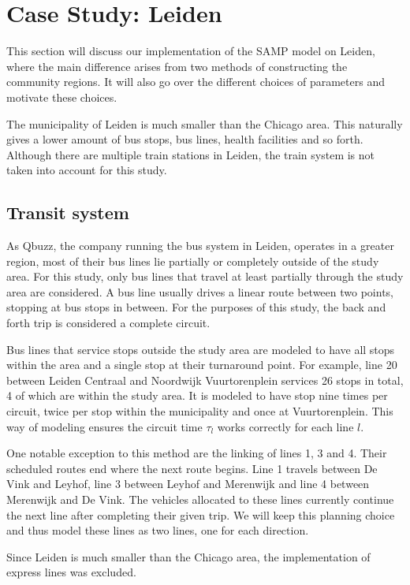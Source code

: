 \chapter{Case Study: Leiden}\label{sec:appliedmodel}
This section will discuss our implementation of the SAMP model on Leiden, where the main difference arises from two methods of constructing the community regions. It will also go over the different choices of parameters and motivate these choices.

The municipality of Leiden is much smaller than the Chicago area. This naturally gives a lower amount of bus stops, bus lines, health facilities and so forth. Although there are multiple train stations in Leiden, the train system is not taken into account for this study.

\section{Transit system}
As Qbuzz, the company running the bus system in Leiden, operates in a greater region, most of their bus lines lie partially or completely outside of the study area. For this study, only bus lines that travel at least partially through the study area are considered. A bus line usually drives a linear route between two points, stopping at bus stops in between. For the purposes of this study, the back and forth trip is considered a complete circuit.

Bus lines that service stops outside the study area are modeled to have all stops within the area and a single stop at their turnaround point. For example, line 20 between Leiden Centraal and Noordwijk Vuurtorenplein services 26 stops in total, 4 of which are within the study area. It is modeled to have stop nine times per circuit, twice per stop within the municipality and once at Vuurtorenplein. This way of modeling ensures the circuit time $\tau_l$ works correctly for each line $l$.

One notable exception to this method are the linking of lines 1, 3 and 4. Their scheduled routes end where the next route begins. Line 1 travels between De Vink and Leyhof, line 3 between Leyhof and Merenwijk and line 4 between Merenwijk and De Vink. The vehicles allocated to these lines currently continue the next line after completing their given trip. We will keep this planning choice and thus model these lines as two lines, one for each direction.

Since Leiden is much smaller than the Chicago area, the implementation of express lines was excluded. %

